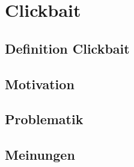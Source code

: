 \chapter{Clickbait} 
\label{cha:clickbait}
\section{Definition Clickbait} 
\label{sec:definition_clickbait}


\section{Motivation} 
\label{sec:motivation}


\section{Problematik} 
\label{sec:problematik}


\section{Meinungen} 
\label{sec:meinungen}


